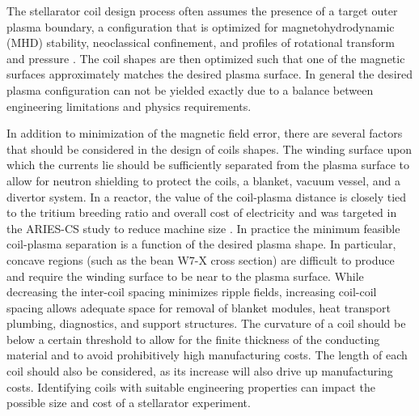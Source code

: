 \documentclass[aps,unsortedaddress]{revtex4-1}
\begin{document}
The stellarator coil design process often assumes the presence of a target outer plasma boundary, a configuration that is optimized for magnetohydrodynamic (MHD) stability, neoclassical confinement, and profiles of rotational transform and pressure \cite{Nuhrenberg1988}. The coil shapes are then optimized such that one of the magnetic surfaces approximately matches the desired plasma surface. In general the desired plasma configuration can not be yielded exactly due to a balance between engineering limitations and physics requirements.

In addition to minimization of the magnetic field error, there are several factors that should be considered in the design of coils shapes. The winding surface upon which the currents lie should be sufficiently separated from the plasma surface to allow for neutron shielding to protect the coils, a blanket, vacuum vessel, and a divertor system. In a reactor, the value of the coil-plasma distance is closely tied to the tritium breeding ratio and overall cost of electricity and was targeted in the ARIES-CS study to reduce machine size \cite{Guebaly2008}. In practice the minimum feasible coil-plasma separation is a function of the desired plasma shape. In particular, concave regions (such as the bean W7-X cross section) are difficult to produce \cite{Landreman2016} and require the winding surface to be near to the plasma surface. While decreasing the inter-coil spacing minimizes ripple fields, increasing coil-coil spacing allows adequate space for removal of blanket modules, heat transport plumbing, diagnostics, and support structures. The curvature of a coil should be below a certain threshold to allow for the finite thickness of the conducting material and to avoid prohibitively high manufacturing costs. The length of each coil should also be considered, as its increase will also drive up manufacturing costs. Identifying coils with suitable engineering properties can impact the possible size and cost of a stellarator experiment. 

\end{document}
